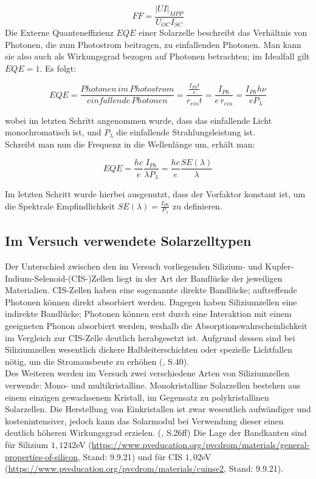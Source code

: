 \begin{equation*}
FF = \frac{|UI|_{MPP}}{U_{OC} I_{SC}}
\end{equation*}
Die Externe Quanteneffizienz $EQE$ einer Solarzelle beschreibt das Verhältnis von Photonen, die zum Photostrom beitragen, zu einfallenden Photonen. Man kann sie also auch als Wirkungsgrad bezogen auf Photonen betrachten; im Idealfall gilt $EQE = 1$. Es folgt:

\begin{equation}
EQE = \frac{Photonen \, im \, Photostrom}{einfallende \, Photonen} = \frac{ \frac{I_{Ph}t}{e}}{r_{ein}t} = \frac{I_{Ph}}{e \, r_{ein}} = \frac{I_{Ph} h \nu}{e P_\lambda}
\end{equation}

wobei im letzten Schritt angenommen wurde, dass das einfallende Licht monochromatisch ist, und $P_\lambda$ die einfallende Strahlungsleistung ist. \\
Schreibt man nun die Frequenz in die Wellenlänge um, erhält man:

\begin{equation}
EQE = \frac{h c}{e} \frac{I_{Ph}}{\lambda P_\lambda} = \frac{h c}{e} \frac{SE(\lambda)}{\lambda}
\end{equation}

Im letzten Schritt wurde hierbei ausgenutzt, dass der Vorfaktor konstant ist, um die Spektrale Empfindlichkeit $SE(\lambda) = \frac{I_{Ph}}{P_\lambda}$ zu definieren.

\subsection{Im Versuch verwendete Solarzelltypen}
Der Unterschied zwischen den im Versuch vorliegenden Silizium- und Kupfer-Indium-Selenoid-(CIS-)Zellen liegt in der Art der Bandlücke der 
jeweiligen Materialien. CIS-Zellen haben eine sogenannte direkte Bandlücke; auftreffende Photonen können direkt absorbiert werden. 
Dagegen haben Siliziumzellen eine indirekte Bandlücke; Photonen können erst durch eine Interaktion mit einem geeigneten Phonon 
absorbiert werden, weshalb die Absorptionswahrscheinlichkeit im Vergleich zur CIS-Zelle deutlich herabgesetzt ist. Aufgrund dessen sind 
bei Siliziumzellen wesentlich dickere Halbleiterschichten oder spezielle Lichtfallen nötig, um die Stromausbeute zu erhöhen 
(\cite{Shah2020}, S.40). \\
Des Weiteren werden im Versuch zwei verschiedene Arten von Siliziumzellen verwende: Mono- und multikristalline. Monokristalline 
Solarzellen bestehen aus einem einzigen gewachsenem Kristall, im Gegensatz zu polykristallinen Solarzellen. Die Herstellung von 
Einkristallen ist zwar wesentlich aufwändiger und kostenintensiver, jedoch kann das Solarmodul bei Verwendung dieser einen deutlich 
höheren Wirkungsgrad erzielen. (\cite{Altekrueger2008}, S.26ff)
Die Lage der Bandkanten sind für Silizium $1,1242$eV 
(\url{https://www.pveducation.org/pvcdrom/materials/general-properties-of-silicon}, Stand: 9.9.21) und für CIS $1,02$eV 
(\url{https://www.pveducation.org/pvcdrom/materials/cuinse2}, Stand: 9.9.21).

